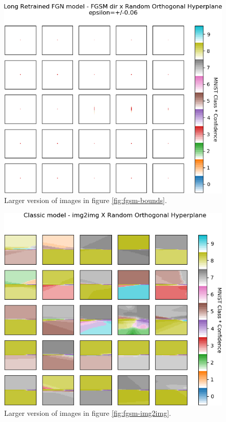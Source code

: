 \documentclass[12pt,oneside]{CUNY_PhD}
\begin{document}
\begin{figure}
    \centering
    \includegraphics[width=\textwidth]{images/observations/long-bounds.png}
    \caption*{Larger version of images in figure \ref{fig:fgsm-bounds}.}
\end{figure}
\begin{figure}
    \centering
    \includegraphics[width=\textwidth]{images/observations/classic-img8toimg4.png}
    \caption*{Larger version of images in figure \ref{fig:fgsm-img2img}.}
\end{figure}
\end{document}
